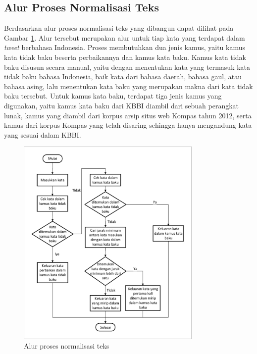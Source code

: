 \subsection{Alur Proses Normalisasi Teks}

Berdasarkan \parencite{saragih2017normalisasi} alur proses normalisasi teks yang dibangun dapat dilihat pada Gambar \ref{fig:flow_saragih}. Alur tersebut merupakan alur untuk tiap kata yang terdapat dalam \textit{tweet} berbahasa Indonesia. Proses membutuhkan dua jenis kamus, yaitu kamus kata tidak baku beserta perbaikannya dan kamus kata baku. Kamus kata tidak baku disusun secara manual, yaitu dengan menentukan kata yang termasuk kata tidak baku bahasa Indonesia, baik kata dari bahasa daerah, bahasa gaul, atau bahasa asing, lalu menentukan kata baku yang merupakan makna dari kata tidak baku tersebut. Untuk kamus kata baku, terdapat tiga jenis kamus yang digunakan, yaitu kamus kata baku dari KBBI diambil dari sebuah perangkat lunak, kamus yang diambil dari korpus arsip situs web Kompas tahun 2012, serta kamus dari korpus Kompas yang telah disaring sehingga hanya mengandung kata yang sesuai dalam KBBI.
\begin{figure}[ht]
	\centering
	\includegraphics[width=0.8\textwidth, trim=2 2 2 2, clip]{resources/2/flow_saragih.pdf}
	\caption{Alur proses normalisasi teks \parencite{saragih2017normalisasi}}
	\label{fig:flow_saragih}
\end{figure}

